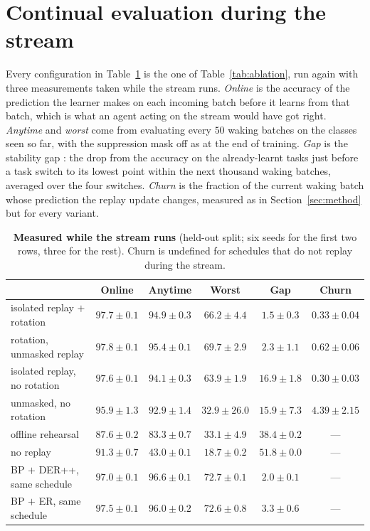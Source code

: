 \documentclass{article}
\begin{document}
\section{Continual evaluation during the stream}
\label{app:online}
Every configuration in Table~\ref{tab:online} is the one of Table~\ref{tab:ablation}, run
again with three measurements taken while the stream runs. \emph{Online} is the accuracy of
the prediction the learner makes on each incoming batch before it learns from that batch,
which is what an agent acting on the stream would have got right. \emph{Anytime} and
\emph{worst} come from evaluating every $50$ waking batches on the classes seen so far, with
the suppression mask off as at the end of training. \emph{Gap} is the stability gap \citep{delange2023}: the
drop from the accuracy on the already-learnt tasks just before a task switch to its lowest
point within the next thousand waking batches, averaged over the four switches.
\emph{Churn} is the fraction of the current waking batch whose prediction the replay update
changes, measured as in Section~\ref{sec:method} but for every variant.

\begin{table}[h]
\centering\footnotesize
\caption{\textbf{Measured while the stream runs} (held-out split; six seeds for the first two
rows, three for the rest). Churn is undefined for schedules that do not replay during the
stream.}
\label{tab:online}
\begin{tabular}{@{}lccccc@{}}
\toprule
 & Online & Anytime & Worst & Gap & Churn \\
\midrule
isolated replay $+$ rotation & $97.7\pm0.1$ & $94.9\pm0.3$ & $66.2\pm4.4$ & $\mathbf{1.5\pm0.3}$ & $\mathbf{0.33\pm0.04}$ \\
rotation, unmasked replay & $97.8\pm0.1$ & $95.4\pm0.1$ & $69.7\pm2.9$ & $2.3\pm1.1$ & $0.62\pm0.06$ \\
isolated replay, no rotation & $97.6\pm0.1$ & $94.1\pm0.3$ & $63.9\pm1.9$ & $16.9\pm1.8$ & $0.30\pm0.03$ \\
unmasked, no rotation & $95.9\pm1.3$ & $92.9\pm1.4$ & $32.9\pm26.0$ & $15.9\pm7.3$ & $4.39\pm2.15$ \\
offline rehearsal & $87.6\pm0.2$ & $83.3\pm0.7$ & $33.1\pm4.9$ & $38.4\pm0.2$ & --- \\
no replay & $91.3\pm0.7$ & $43.0\pm0.1$ & $18.7\pm0.2$ & $51.8\pm0.0$ & --- \\
BP $+$ DER++, same schedule & $97.0\pm0.1$ & $\mathbf{96.6\pm0.1}$ & $\mathbf{72.7\pm0.1}$ & $2.0\pm0.1$ & --- \\
BP $+$ ER, same schedule & $97.5\pm0.1$ & $96.0\pm0.2$ & $72.6\pm0.8$ & $3.3\pm0.6$ & --- \\
\bottomrule
\end{tabular}
\end{table}
\end{document}

